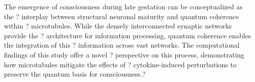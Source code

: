 The emergence of consciousness during late gestation can be conceptualized as the ?
interplay between structural neuronal maturity and quantum coherence within ?
microtubules. While the densely interconnected synaptic networks provide the ?
architecture for information processing, quantum coherence enables the integration of this ?
information across vast networks. The computational findings of this study offer a novel ?
perspective on this process, demonstrating how microtubules mitigate the effects of ?
cytokine-induced perturbations to preserve the quantum basis for consciousness.?



